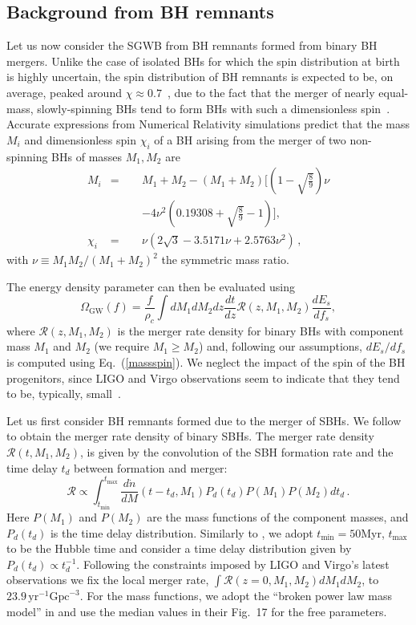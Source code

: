 \documentclass[
reprint,           %
superscriptaddress,%
amsmath,           %
amssymb,           %
aps,               %
prd,               %
notitlepage,       %
floatfix,          %
nofootinbib %
]{revtex4-1}
\def\e{\begin{equation}}
\def\q{\end{equation}}
\begin{document}
\subsection{Background from BH remnants}
Let us now consider the SGWB from BH remnants formed from binary BH mergers. Unlike the case of isolated BHs for which the spin distribution at birth is highly uncertain, the spin distribution of BH remnants is expected to be, on average, peaked around $\chi\approx 0.7$~\cite{Gerosa:2017kvu,Fishbach:2017dwv}, due to the fact that the merger of nearly equal-mass, slowly-spinning BHs tend to form  BHs with such a dimensionless spin~\cite{Berti:2007fi,Scheel:2008rj,Barausse:2009uz}. Accurate expressions from Numerical Relativity simulations predict that the mass $M_i$ and dimensionless spin $\chi_i$ of a BH arising from the merger of two non-spinning BHs of masses $M_1,M_2$ are~\cite{Berti:2007fi,Scheel:2008rj,Barausse:2009uz}
%
\begin{eqnarray}\label{massspin}
M_i&=&M_1+M_2-(M_1+M_2)\Bigg[\left(1-\sqrt{\frac{8}{9}} \right)\nu\nonumber\\
&\qquad&-4\nu^2\left(0.19308+\sqrt{\frac{8}{9}} -1 \right)\Bigg],\nonumber\\
%
\chi_i&=&\nu (2\sqrt{3}-3.5171\nu+2.5763\nu^2)\,,
\end{eqnarray}
%
with $\nu \equiv M_1M_2/(M_1+M_2)^2$ the symmetric mass ratio.

The energy density parameter can then be evaluated using \cite{Phinney:2001di}
\e
\Omega_{\mathrm{GW}}(f)=\frac{f}{\rho_{c}} \int  d M_1 dM_2 d z \frac{d t}{d z} \mathcal{R}(z,M_1,M_2) \frac{d E_{s}}{d f_{s}},
\q
where $\mathcal{R}(z,M_1,M_2)$ is the merger rate density for binary BHs with component mass $M_1$ and $M_2$ (we require $M_1\ge M_2$) and, following our assumptions, $d E_{s}/d f_{s}$ is computed using Eq.~(\ref{massspin}). We neglect the impact of the spin of the BH progenitors, since LIGO and Virgo observations seem to indicate that they tend to be, typically, small~\cite{Abbott:2020gyp}.

Let us first consider BH remnants formed due to the merger of SBHs. We follow \cite{Abbott:2017xzg,TheLIGOScientific:2016wyq} to obtain the merger rate density of binary SBHs. The merger rate density $\mathcal{R}(t,M_1,M_2)$, is given by the convolution of the SBH formation rate and the time delay $t_d$ between formation and merger:
\e\label{eq:rateSBH}
\mathcal{R}\propto \int_{t_{\min }}^{t_{\max }}
\frac{d \dot{n}}{d M}
\left(t-t_{d}, M_1\right) P_{d}\left(t_{d}\right)P(M_1)P(M_2) d t_{d}\,.
\q
Here $P(M_1)$ and $P(M_2)$ are the mass functions of the component masses, and $P_{d}\left(t_{d}\right)$ is the time delay distribution. 
%
Similarly to \cite{Abbott:2017xzg,TheLIGOScientific:2016wyq}, we adopt $t_{\min} =50$Myr, $t_{\max}$ to be the Hubble time and consider a time delay distribution given by $P_d(t_d)\propto t_d^{-1}$. 
%
Following the constraints imposed by LIGO and Virgo's latest observations we fix the local merger rate, $\int \mathcal{R}(z=0,M_1,M_2)dM_1dM_2$, to $23.9\, \mathrm{yr}^{-1}\mathrm{Gpc}^{-3}$. For the mass functions, we adopt the ``broken power law mass model'' in \cite{Abbott:2020gyp} and use the median values in their Fig.~17 for the free parameters.
\end{document}
